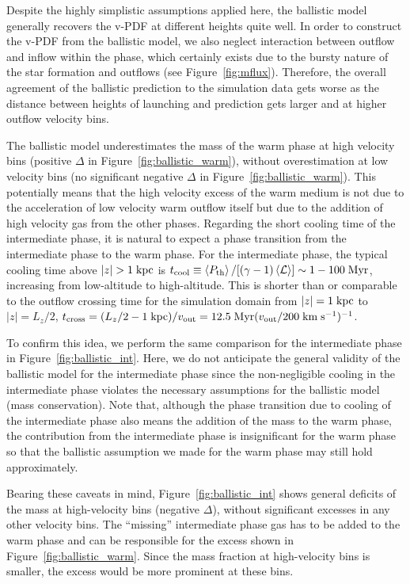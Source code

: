 \documentclass[twocolumn]{aastex62}
\newcommand\kms{\; {\rm km}\;{\rm s}^{-1}}
\newcommand\Myr{\;{\rm Myr}}
\newcommand\kpc{\;{\rm kpc}}
\newcommand\abrackets[1]{\left\langle{#1}\right\rangle}
\begin{document}
Despite the highly simplistic assumptions applied here, the ballistic model generally recovers the v-PDF at different heights quite well. In order to construct the v-PDF from the ballistic model, we also neglect interaction between outflow and inflow within the phase, which certainly exists due to the bursty nature of the star formation and outflows (see Figure~\ref{fig:mflux}). Therefore, the overall agreement of the ballistic prediction to the simulation data gets worse as the distance between heights of launching and prediction gets larger and at higher outflow velocity bins. 

The ballistic model underestimates the mass of the warm phase at high velocity bins (positive $\Delta$ in Figure~\ref{fig:ballistic_warm}), without overestimation at low velocity bins (no significant negative $\Delta$ in Figure~\ref{fig:ballistic_warm}). This potentially means that the high velocity excess of the warm medium is not due to the acceleration of low velocity warm outflow itself but due to the addition of high velocity gas from the other phases. Regarding the short cooling time of the intermediate phase, it is natural to expect a phase transition from the intermediate phase to the warm phase. For the intermediate phase, the typical cooling time above $|z|>1\kpc$ is $t_{\rm cool}\equiv \abrackets{P_{\rm th}}/[(\gamma-1)\abrackets{\mathcal{L}}]\sim 1-100\Myr$, increasing from low-altitude to high-altitude. This is shorter than or comparable to the outflow crossing time for the simulation domain from $|z|=1\kpc$ to $|z|=L_z/2$, $t_{\rm cross}=(L_z/2 - 1\kpc)/v_{\rm out} = 12.5\Myr (v_{\rm out}/200\kms)^{-1}$.

To confirm this idea, we perform the same comparison for the intermediate phase in Figure~\ref{fig:ballistic_int}. 
Here, we do not anticipate the general validity of the ballistic model for the intermediate phase since the non-negligible cooling in the intermediate phase violates the necessary assumptions for the ballistic model (mass conservation). Note that, although the phase transition due to cooling of the intermediate phase also means the addition of the mass to the warm phase, the contribution from the intermediate phase is insignificant for the warm phase so that the ballistic assumption we made for the warm phase may still hold approximately. 

Bearing these caveats in mind, Figure~\ref{fig:ballistic_int} shows general deficits of the mass at high-velocity bins (negative $\Delta$), without significant excesses in any other velocity bins. The ``missing'' intermediate phase gas has to be added to the warm phase and can be responsible for the excess shown in Figure~\ref{fig:ballistic_warm}. Since the mass fraction at high-velocity bins is smaller, the excess would be more prominent at these bins.
\end{document}
